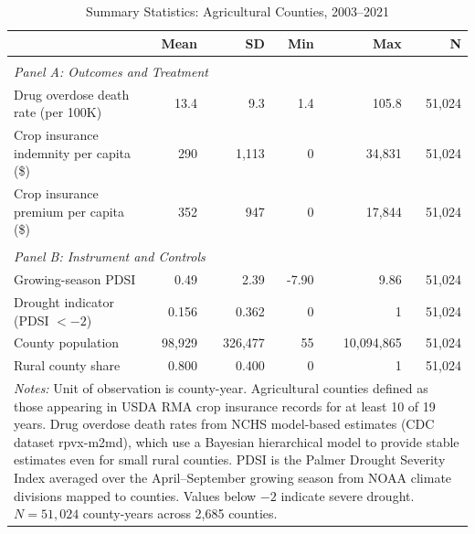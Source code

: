 \begin{table}[t]
\centering
\caption{Summary Statistics: Agricultural Counties, 2003--2021}
\label{tab:summary}
\begin{tabular}{lrrrrr}
\hline\hline
 & Mean & SD & Min & Max & N \\
\hline
\\[-1.8ex]
\multicolumn{6}{l}{\textit{Panel A: Outcomes and Treatment}} \\[0.3ex]
Drug overdose death rate (per 100K) & 13.4 & 9.3 & 1.4 & 105.8 & 51,024 \\
Crop insurance indemnity per capita (\$) & 290 & 1,113 & 0 & 34,831 & 51,024 \\
Crop insurance premium per capita (\$) & 352 & 947 & 0 & 17,844 & 51,024 \\
\\[-1.8ex]
\multicolumn{6}{l}{\textit{Panel B: Instrument and Controls}} \\[0.3ex]
Growing-season PDSI & 0.49 & 2.39 & -7.90 & 9.86 & 51,024 \\
Drought indicator (PDSI $< -2$) & 0.156 & 0.362 & 0 & 1 & 51,024 \\
County population & 98,929 & 326,477 & 55 & 10,094,865 & 51,024 \\
Rural county share & 0.800 & 0.400 & 0 & 1 & 51,024 \\
\hline\hline
\multicolumn{6}{p{0.95\textwidth}}{\footnotesize \textit{Notes:}
Unit of observation is county-year. Agricultural counties defined as those
appearing in USDA RMA crop insurance records for at least 10 of 19 years.
Drug overdose death rates from NCHS model-based estimates (CDC dataset rpvx-m2md),
which use a Bayesian hierarchical model to provide stable estimates even for small
rural counties. PDSI is the Palmer Drought Severity Index averaged over the
April--September growing season from NOAA climate divisions mapped to counties.
Values below $-2$ indicate severe drought. $N = 51{,}024$ county-years
across 2,685 counties.}
\end{tabular}
\end{table}
